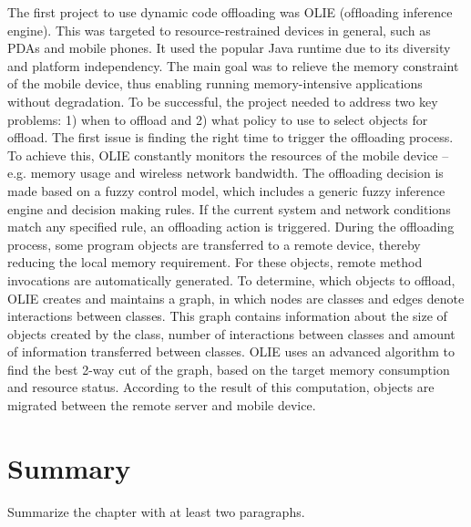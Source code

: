 The first project to use dynamic code offloading was OLIE (ofﬂoading inference engine). This was targeted to resource-restrained devices in general, such as PDAs and mobile phones. It used the popular Java runtime due to its diversity and platform independency. The main goal was to relieve the memory constraint of the mobile device, thus enabling running memory-intensive applications without degradation.
To be successful, the project needed to address two key problems: 1) when to offload and 2) what policy to use to select objects for offload.
The first issue is finding the right time to trigger the offloading process. To achieve this, OLIE constantly monitors the resources of the mobile device – e.g. memory usage and wireless network bandwidth. The offloading decision is made based on a fuzzy control model, which includes a generic fuzzy inference engine and decision making rules. If the current system and network conditions match any specified rule, an offloading action is triggered. During the offloading process, some program objects are transferred to a remote device, thereby reducing the local memory requirement. For these objects, remote method invocations are automatically generated.
To determine, which objects to offload, OLIE creates and maintains a graph, in which nodes are classes and edges denote interactions between classes. This graph contains information about the size of objects created by the class, number of interactions between classes and amount of information transferred between classes. OLIE uses an advanced algorithm to find the best 2-way cut of the graph, based on the target memory consumption and resource status. According to the result of this computation, objects are migrated between the remote server and mobile device.


\section{Summary}
Summarize the chapter with at least two paragraphs.




